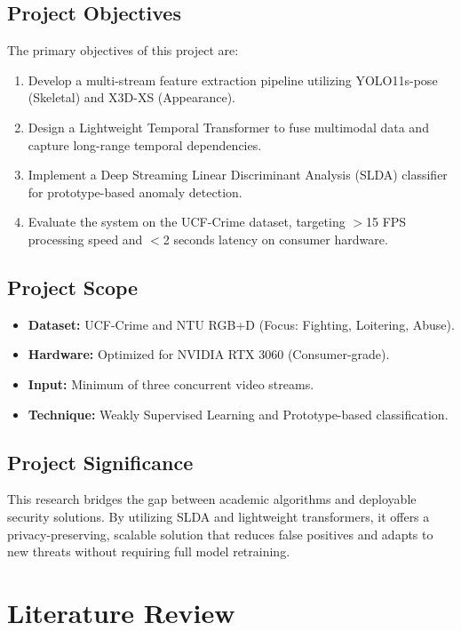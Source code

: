 \documentclass[12pt]{article}
\begin{document}
\subsection{Project Objectives}
The primary objectives of this project are:
\begin{enumerate}
    \item Develop a multi-stream feature extraction pipeline utilizing YOLO11s-pose (Skeletal) and X3D-XS (Appearance).
    \item Design a Lightweight Temporal Transformer to fuse multimodal data and capture long-range temporal dependencies.
    \item Implement a Deep Streaming Linear Discriminant Analysis (SLDA) classifier for prototype-based anomaly detection.
    \item Evaluate the system on the UCF-Crime dataset, targeting $>$15 FPS processing speed and $<$2 seconds latency on consumer hardware.
\end{enumerate}

\subsection{Project Scope}
\begin{itemize}
    \item \textbf{Dataset:} UCF-Crime and NTU RGB+D (Focus: Fighting, Loitering, Abuse).
    \item \textbf{Hardware:} Optimized for NVIDIA RTX 3060 (Consumer-grade).
    \item \textbf{Input:} Minimum of three concurrent video streams.
    \item \textbf{Technique:} Weakly Supervised Learning and Prototype-based classification.
\end{itemize}

\subsection{Project Significance}
This research bridges the gap between academic algorithms and deployable security solutions. By utilizing SLDA and lightweight transformers, it offers a privacy-preserving, scalable solution that reduces false positives and adapts to new threats without requiring full model retraining.

\clearpage


\section{Literature Review}
\end{document}
